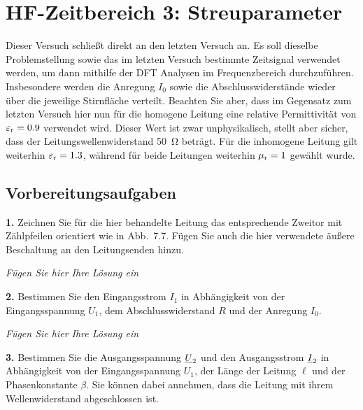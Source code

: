 \documentclass[Protokollheft.tex]{subfiles}
\begin{document}
\chapter{HF-Zeitbereich 3: Streuparameter}
Dieser Versuch schließt direkt an den letzten Versuch an. Es soll dieselbe
Problemstellung sowie das im letzten Versuch bestimmte Zeitsignal verwendet werden,
um dann mithilfe der DFT Analysen im Frequenzbereich durchzuführen. Insbesondere 
werden die Anregung $I_0$ sowie die Abschlusswiderstände wieder über die jeweilige 
Stirnfläche verteilt. Beachten Sie aber, dass im Gegensatz zum letzten Versuch hier nun
für die homogene Leitung eine relative Permittivität von $\varepsilon_{\text{r}}=0.9$ verwendet wird.
Dieser Wert ist zwar unphysikalisch, stellt aber sicher, dass der 
Leitungswellenwiderstand \SI{50}{\ohm} beträgt. Für die inhomogene Leitung gilt weiterhin
$\varepsilon_{\text{r}}=1.3$, während für beide Leitungen weiterhin $\mu_{\text{r}}=1$ gewählt wurde.

\section{Vorbereitungsaufgaben}

\begin{framed}
	\noindent \textbf{1.} Zeichnen Sie für die hier behandelte Leitung das entsprechende Zweitor mit Zählpfeilen orientiert wie in Abb.~7.7. Fügen Sie auch die hier verwendete äußere Beschaltung an den Leitungsenden hinzu.\label{exer:twoPort}
\end{framed}

\emph{Fügen Sie hier Ihre Lösung ein}

\begin{framed}
	\noindent \textbf{2.} Bestimmen Sie den Eingangsstrom $I_1$ in Abhängigkeit von der Eingangsspannung $U_1$, dem Abschlusswiderstand $R$ und der Anregung $I_0$.\label{exer:calcI1}
\end{framed}

\emph{Fügen Sie hier Ihre Lösung ein}

\begin{framed}
	\noindent \textbf{3.} Bestimmen Sie die Ausgangsspannung $\underline{U}_2$ und den Ausgangsstrom $\underline{I}_2$ in Abhängigkeit von der Eingangsspannung $U_1$, der Länge der Leitung $\ell$ und der Phasenkonstante $\beta$. Sie können dabei annehmen, dass die Leitung mit ihrem Wellenwiderstand abgeschlossen ist.\label{exer:calcU2I2}
\end{framed}
\end{document}
